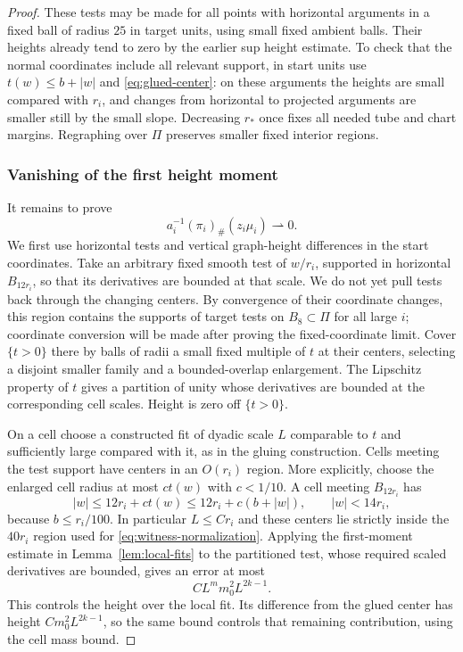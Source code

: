 \begin{proof}
These tests may be made for all points with horizontal arguments in a
fixed ball of radius $25$ in target units, using small fixed ambient
balls. Their heights already tend to zero by the earlier sup height
estimate. To check that the normal coordinates include all relevant
support, in start units use $t(w)\le b+|w|$ and
\eqref{eq:glued-center}: on these arguments the heights are small
compared with $r_i$, and changes from horizontal to projected arguments
are smaller still by the small slope. Decreasing $r_*$ once fixes all
needed tube and chart margins. Regraphing over $\Pi$ preserves smaller
fixed interior regions.

\subsubsection*{Vanishing of the first height moment}
It remains to prove
\begin{equation}\label{eq:centered-first-moment}
 a_i^{-1}(\pi_i)_\#(z_i\mu_i)\rightharpoonup0.
\end{equation}
We first use horizontal tests and vertical graph-height differences in
the start coordinates. Take an arbitrary fixed smooth test of $w/r_i$,
supported in horizontal $B_{12r_i}$, so that its derivatives are bounded
at that scale. We do not yet pull tests back through the changing
centers. By convergence of their coordinate changes, this region
contains the supports of target tests on $B_8\subset\Pi$ for all
large $i$; coordinate conversion will be made after proving the
fixed-coordinate limit.
Cover $\{t>0\}$ there by balls of radii a small fixed multiple of
$t$ at their centers, selecting a disjoint smaller family and a
bounded-overlap enlargement. The Lipschitz property of $t$ gives a
partition of unity whose derivatives are bounded at the corresponding
cell scales. Height is zero off $\{t>0\}$.

On a cell choose a constructed fit of dyadic scale $L$ comparable to
$t$ and sufficiently large compared with it, as in the gluing
construction. Cells meeting the test support have centers in an
$O(r_i)$ region. More explicitly, choose the enlarged cell radius
at most $ct(w)$ with $c<1/10$. A cell meeting $B_{12r_i}$ has
\[
 |w|\le12r_i+ct(w)\le12r_i+c(b+|w|),
 \qquad |w|<14r_i,
\]
because $b\le r_i/100$. In particular $L\le Cr_i$ and these centers
lie strictly inside the $40r_i$ region used for
\eqref{eq:witness-normalization}. Applying the
first-moment estimate in Lemma~\ref{lem:local-fits} to the partitioned
test, whose required scaled derivatives are bounded, gives an error
at most
\begin{equation}\label{eq:cell-moment-error}
 CL^m m_0^2L^{2k-1}.
\end{equation}
This controls the height over the local fit. Its difference from the
glued center has height $Cm_0^2L^{2k-1}$, so the same bound controls
that remaining contribution, using the cell mass bound.


\end{proof}
